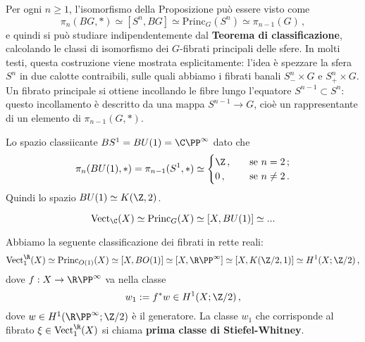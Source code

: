 \begin{ex}
	\begin{rmnumerate}
		\item Per ogni $n \ge 1$, l'isomorfismo della Proposizione può essere visto come
		\begin{equation*}
			\pi_{n}(BG,\ast) \simeq [S^{n},BG] \simeq \mathrm{Princ}_{G}(S^{n}) \simeq \pi_{n-1}(G)\,,
		\end{equation*}
		e quindi si può studiare indipendentemente dal \textbf{Teorema di classificazione},
		calcolando le classi di isomorfismo dei $G$-fibrati principali delle sfere.
		In molti testi, questa costruzione viene mostrata esplicitamente:
		l'idea è spezzare la sfera $S^{n}$ in due calotte contraibili,
		sulle quali abbiamo i fibrati banali $S^{n}_{-} \times G$ e $S^{n}_{+} \times G$.
		Un fibrato principale si ottiene incollando le fibre lungo l'equatore $S^{n-1} \subset S^{n}$:
		questo incollamento è descritto da una mappa $S^{n-1} \to G$, 
		cioè un rappresentante di un elemento di $\pi_{n-1}(G,\ast)$.
		
		\item Lo spazio classiicante $BS^{1} = BU(1) = \C\PP^{\infty}$ dato che
		\begin{equation*}
			\pi_{n}(BU(1),\ast) = \pi_{n-1}(S^{1},\ast) \simeq
			\begin{cases}
				\Z\,, \quad &\text{se } n=2\,; \\
				0\,, \quad &\text{se } n \ne 2\,.
			\end{cases}
		\end{equation*}
		Quindi lo spazio $BU(1) \simeq K(\Z,2)$.
	\end{rmnumerate}
\end{ex}

\begin{thm}
	\begin{equation*}
		\mathrm{Vect}_{\C}(X) \simeq \mathrm{Princ}_{G}(X)
		\simeq [X,BU(1)] \simeq ...
	\end{equation*}
\end{thm}

\begin{thm}
	Abbiamo la seguente classificazione dei fibrati in rette reali:
	\begin{equation*}
		\mathrm{Vect}_{1}^{\R}(X) 
		\simeq \mathrm{Princ}_{O(1)}(X)
		\simeq [X,BO(1)]
		\simeq [X,\R\PP^{\infty}]
		\simeq [X,K(\Z/2,1)]
		\simeq H^{1}(X;\Z/2)\,,
	\end{equation*}
	dove $f:X \to \R\PP^{\infty}$ va nella classe
	\begin{equation*}
		w_{1} := f^{*}w \in H^{1}(X;\Z/2)\,,
	\end{equation*}
	dove $w \in H^{1}(\R\PP^{\infty};\Z/2)$ è il generatore.
	La classe $w_{1}$ che corrisponde al fibrato $\xi \in \mathrm{Vect}_{1}^{\R}(X)$
	si chiama \textbf{prima classe di Stiefel-Whitney}.
\end{thm}

